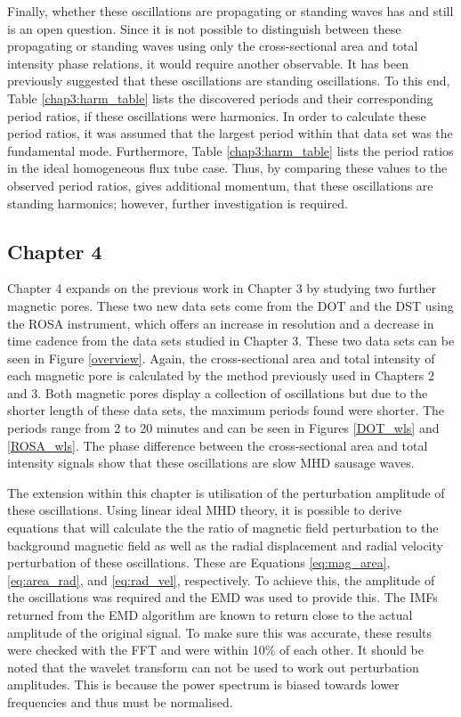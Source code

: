     Finally, whether these oscillations are propagating or standing waves has and still is an open question. 
    Since it is not possible to distinguish between these propagating or standing waves using only the cross-sectional area and total intensity phase relations, it would require another observable.
    It has been previously suggested that these oscillations are standing oscillations.
    To this end, Table \ref{chap3:harm_table} lists the discovered periods and their corresponding period ratios, if these oscillations were harmonics.
    In order to calculate these period ratios, it was assumed that the largest period within that data set was the fundamental mode. 
    Furthermore, Table \ref{chap3:harm_table} lists the period ratios in the ideal homogeneous flux tube case.       
    Thus, by comparing these values to the observed period ratios, gives additional momentum, that these oscillations are standing harmonics; however, further investigation is required.
    
    \subsection{Chapter 4}
    	
    Chapter 4 expands on the previous work in Chapter 3 by studying two further magnetic pores.
    These two new data sets come from the DOT and the DST using the ROSA instrument, which offers an increase in resolution and a decrease in time cadence from the data sets studied in Chapter 3.
    These two data sets can be seen in Figure \ref{overview}.
    Again, the cross-sectional area and total intensity of each magnetic pore is calculated by the method previously used in Chapters 2 and 3. 
    Both magnetic pores display a collection of oscillations but due to the shorter length of these data sets, the maximum periods found were shorter.
    The periods range from 2 to 20 minutes and can be seen in Figures \ref{DOT_wls} and \ref{ROSA_wls}.     
    The phase difference between the cross-sectional area and total intensity signals show that these oscillations are slow MHD sausage waves.
    
    The extension within this chapter is utilisation of the perturbation amplitude of these oscillations.
    Using linear ideal MHD theory, it is possible to derive equations that will calculate the the ratio of magnetic field perturbation to the background magnetic field as well as the radial displacement and radial velocity perturbation of these oscillations.
    These are Equations \ref{eq:mag_area}, \ref{eq:area_rad}, and \ref{eq:rad_vel}, respectively. 
    To achieve this, the amplitude of the oscillations was required and the EMD was used to provide this.
    The IMFs returned from the EMD algorithm are known to return close to the actual amplitude of the original signal.
    To make sure this was accurate, these results were checked with the FFT and were within 10\% of each other.
	It should be noted that the wavelet transform can not be used to work out perturbation amplitudes.
	This is because the power spectrum is biased towards lower frequencies and thus must be normalised.
  
